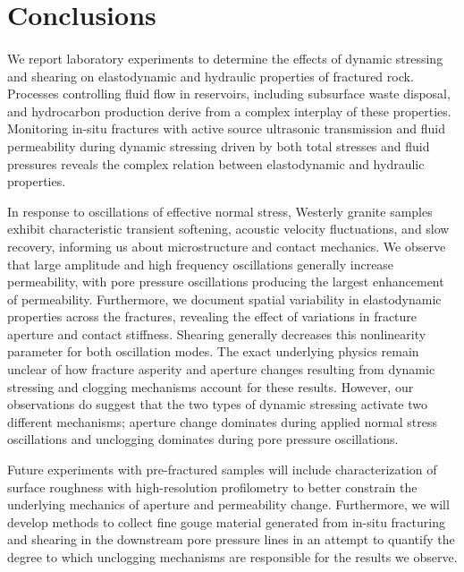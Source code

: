 \documentclass[letterpaper,10pt]{article}
\begin{document}
\clearpage


\section{Conclusions}
\paragraph{}
We  report laboratory experiments to determine the effects of dynamic stressing and shearing on elastodynamic and hydraulic properties of fractured rock. Processes controlling fluid flow in reservoirs, including subsurface waste disposal, and hydrocarbon production derive from a complex interplay of these properties. Monitoring in-situ fractures with active source ultrasonic transmission and fluid permeability during dynamic stressing driven by both total stresses and fluid pressures reveals the complex relation between elastodynamic and hydraulic properties. 

In response to oscillations of effective normal stress, Westerly granite samples exhibit characteristic transient softening, acoustic velocity fluctuations, and slow recovery, informing us about microstructure and contact mechanics. We observe that large amplitude and high frequency oscillations generally increase permeability, with pore pressure oscillations producing the largest enhancement of permeability. Furthermore, we document spatial variability in elastodynamic properties across the fractures, revealing the effect of variations in fracture aperture and contact stiffness. Shearing generally decreases this nonlinearity parameter for both oscillation modes.
The exact underlying physics remain unclear of how fracture asperity and aperture changes resulting from dynamic stressing and clogging mechanisms account for these results. However, our observations do suggest that the two types of dynamic stressing activate two different mechanisms; aperture change dominates during applied normal stress oscillations and unclogging dominates during pore pressure oscillations. 

Future experiments with pre-fractured samples will include characterization of surface roughness with high-resolution profilometry to better constrain the underlying mechanics of aperture and permeability change. Furthermore, we will develop methods to collect fine gouge material generated from in-situ fracturing and shearing in the downstream pore pressure lines in an attempt to quantify the degree to which unclogging mechanisms are responsible for the results we observe.
\clearpage
\end{document}

